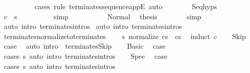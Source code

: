 \begin{isabellebody}
\ \ \ \ \ \ \ \ \isamarkupfalse%
\ {\isacharparenleft}cases\ rule{\isacharcolon}\ terminates{\isacharunderscore}sequence{\isacharunderscore}appE{\isacharparenright}\ auto\isanewline
\ \ \ \ \ \ \isamarkupfalse%
\ Seq{\isachardot}hyps\isanewline
\ \ \ \ \ \ \isamarkupfalse%
\ {\isachardoublequoteopen}{\isasymGamma}{\isasymturnstile}c{}\ {\isasymdown}\ s{\isacharprime}{\isacharprime}{\isachardoublequoteclose}\isanewline
\ \ \ \ \ \ \ \ \isamarkupfalse%
\ simp\isanewline
\ \ \ \ \isamarkupfalse%
\isanewline
\ \ \ \ \isamarkupfalse%
\ Normal\ \isamarkupfalse%
\ {\isacharquery}thesis\isanewline
\ \ \ \ \ \ \isamarkupfalse%
\ simp\isanewline
\ \ \isamarkupfalse%
\ {\isacharparenleft}auto\ intro{\isacharcolon}\ terminates{\isachardot}intros{\isacharparenright}\isanewline
{}\isamarkupfalse%
\ {\isacharparenleft}auto\ intro{\isacharcolon}\ terminates{\isachardot}intros{\isacharparenright}%
\endisatagproof
{\isafoldproof}%
%
\isadelimproof
\isanewline
%
\endisadelimproof
\isanewline
{}\isamarkupfalse%
\ terminates{\isacharunderscore}normalize{\isacharunderscore}to{\isacharunderscore}terminates{\isacharcolon}\ \isanewline
\ \ \ {\isachardoublequoteopen}{\isasymAnd}s{\isachardot}\ {\isasymGamma}{\isasymturnstile}normalize\ c{\isasymdown}s\ {\isasymLongrightarrow}\ {\isasymGamma}{\isasymturnstile}c{\isasymdown}s{\isachardoublequoteclose}\ \isanewline
%
\isadelimproof
%
\endisadelimproof
%
\isatagproof
{}\isamarkupfalse%
\ {\isacharparenleft}induct\ c{\isacharparenright}\isanewline
\ \ \isamarkupfalse%
\ Skip\ \isamarkupfalse%
\ {\isacharquery}case\ \isamarkupfalse%
\ {\isacharparenleft}auto\ intro{\isacharcolon}\ \ terminates{\isacharunderscore}Skip{\isacharprime}{\isacharparenright}\isanewline
{}\isamarkupfalse%
\isanewline
\ \ \isamarkupfalse%
\ Basic\ \isamarkupfalse%
\ {\isacharquery}case\ \isamarkupfalse%
\ {\isacharparenleft}cases\ s{\isacharparenright}\ {\isacharparenleft}auto\ intro{\isacharcolon}\ terminates{\isachardot}intros{\isacharparenright}\isanewline
{}\isamarkupfalse%
\isanewline
\ \ \isamarkupfalse%
\ Spec\ \isamarkupfalse%
\ {\isacharquery}case\ \isamarkupfalse%
\ {\isacharparenleft}cases\ s{\isacharparenright}\ {\isacharparenleft}auto\ intro{\isacharcolon}\ terminates{\isachardot}intros{\isacharparenright}\isanewline

\end{isabellebody}
